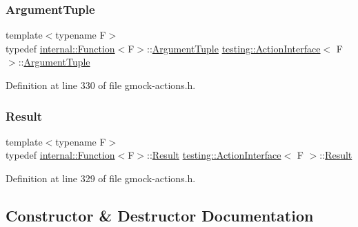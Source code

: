 \subsubsection{\texorpdfstring{Argument\+Tuple}{ArgumentTuple}}
{\footnotesize\ttfamily template$<$typename F$>$ \\
typedef \hyperlink{structtesting_1_1internal_1_1Function}{internal\+::\+Function}$<$F$>$\+::\hyperlink{classtesting_1_1ActionInterface_af72720d864da4d606629e83edc003511}{Argument\+Tuple} \hyperlink{classtesting_1_1ActionInterface}{testing\+::\+Action\+Interface}$<$ F $>$\+::\hyperlink{classtesting_1_1ActionInterface_af72720d864da4d606629e83edc003511}{Argument\+Tuple}}



Definition at line 330 of file gmock-\/actions.\+h.

\mbox{\label{classtesting_1_1ActionInterface_a7477de2fe3e4e01c59db698203acaee7}} 
\subsubsection{\texorpdfstring{Result}{Result}}
{\footnotesize\ttfamily template$<$typename F$>$ \\
typedef \hyperlink{structtesting_1_1internal_1_1Function}{internal\+::\+Function}$<$F$>$\+::\hyperlink{classtesting_1_1ActionInterface_a7477de2fe3e4e01c59db698203acaee7}{Result} \hyperlink{classtesting_1_1ActionInterface}{testing\+::\+Action\+Interface}$<$ F $>$\+::\hyperlink{classtesting_1_1ActionInterface_a7477de2fe3e4e01c59db698203acaee7}{Result}}



Definition at line 329 of file gmock-\/actions.\+h.



\subsection{Constructor \& Destructor Documentation}
\mbox{\label{classtesting_1_1ActionInterface_a0f1d44e4c669a9cae5ee5b28419a6f52}} 
